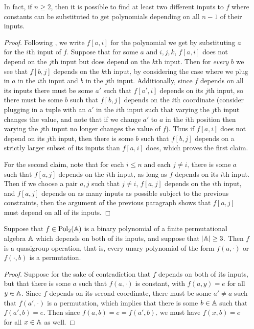 \begin{appendices}
\begin{prop}
In fact, if $n \ge 2$, then it is possible to find at least two different inputs to $f$ where constants can be substituted to get polynomials depending on all $n-1$ of their inputs.
\end{prop}
\begin{proof} Following \cite{hobby-mckenzie}, we write $f[a,i]$ for the polynomial we get by substituting $a$ for the $i$th input of $f$. Suppose that for some $a$ and $i,j,k$, $f[a,i]$ does not depend on the $j$th input but does depend on the $k$th input. Then for \emph{every} $b$ we see that $f[b,j]$ depends on the $k$th input, by considering the case where we plug in $a$ in the $i$th input and $b$ in the $j$th input. Additionally, since $f$ depends on all its inputs there must be some $a'$ such that $f[a',i]$ depends on its $j$th input, so there must be some $b$ such that $f[b,j]$ depends on the $i$th coordinate (consider plugging in a tuple with an $a'$ in the $i$th input such that varying the $j$th input changes the value, and note that if we change $a'$ to $a$ in the $i$th position then varying the $j$th input no longer changes the value of $f$). Thus if $f[a,i]$ does not depend on its $j$th input, then there is some $b$ such that $f[b,j]$ depends on a strictly larger subset of its inputs than $f[a,i]$ does, which proves the first claim.

For the second claim, note that for each $i \le n$ and each $j \ne i$, there is some $a$ such that $f[a,j]$ depends on the $i$th input, as long as $f$ depends on its $i$th input. Then if we choose a pair $a,j$ such that $j\ne i$, $f[a,j]$ depends on the $i$th input, and $f[a,j]$ depends on as many inputs as possible subject to the previous constraints, then the argument of the previous paragraph shows that $f[a,j]$ must depend on all of its inputs.
\end{proof}

\begin{lem}\label{lem-permutational-quasigroup} Suppose that $f \in \operatorname{Pol}_2(\mathbb{A})$ is a binary polynomial of a finite permutational algebra $\mathbb{A}$ which depends on both of its inputs, and suppose that $|\mathbb{A}| \ge 3$. Then $f$ is a quasigroup operation, that is, every unary polynomial of the form $f(a,\cdot)$ or $f(\cdot, b)$ is a permutation.
\end{lem}
\begin{proof} Suppose for the sake of contradiction that $f$ depends on both of its inputs, but that there is some $a$ such that $f(a,\cdot)$ is constant, with $f(a,y) = e$ for all $y \in \mathbb{A}$. Since $f$ depends on its second coordinate, there must be some $a' \ne a$ such that $f(a',\cdot)$ is a permutation, which implies that there is some $b \in \mathbb{A}$ such that $f(a',b) = e$. Then since $f(a,b) = e = f(a',b)$, we must have $f(x,b) = e$ for all $x \in \mathbb{A}$ as well.


\end{proof}
\end{appendices}
